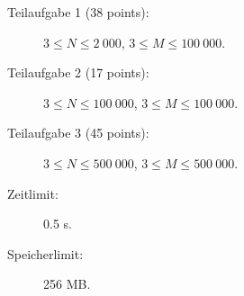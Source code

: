 \documentclass{boi2014-de}
\begin{document}
    \Scoring

    \begin{description}
        \item[Teilaufgabe 1 (38 points):] $3 \le N \le 2\ 000$, $3 \le M \le 100\ 000$.
        \item[Teilaufgabe 2 (17 points):] $3 \le N \le 100\ 000$, $3 \le M \le 100\ 000$.
        \item[Teilaufgabe 3 (45 points):] $3 \le N \le 500\ 000$, $3 \le M \le 500\ 000$.
    \end{description}

    \Constraints

    \begin{description}
        \item[Zeitlimit:] 0.5 s.
        \item[Speicherlimit:] 256 MB.
    \end{description}
\end{document}
